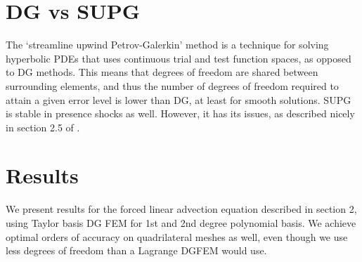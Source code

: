 \documentclass[11pt]{article}
\begin{document}
\section{DG vs SUPG}
The `streamline upwind Petrov-Galerkin' method is a technique for solving hyperbolic PDEs that uses continuous trial and test function spaces, as opposed to DG methods. This means that degrees of freedom are shared between surrounding elements, and thus the number of degrees of freedom required to attain a given error level is lower than DG, at least for smooth solutions. SUPG is stable in presence shocks as well. However, it has its issues, as described nicely in section 2.5 of \cite{hartmann_thesis}.

\section{Results}

We present results for the forced linear advection equation described in section 2, using Taylor basis DG FEM for 1st and 2nd degree polynomial basis. We achieve optimal orders of accuracy on quadrilateral meshes as well, even though we use less degrees of freedom than a Lagrange DGFEM would use.
\end{document}
